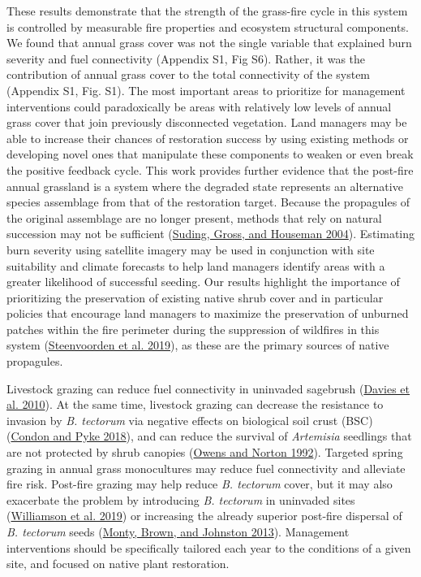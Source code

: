 \documentclass[
  12pt,
]{article}
\begin{document}
These results demonstrate that the strength of the grass-fire cycle in
this system is controlled by measurable fire properties and ecosystem
structural components. We found that annual grass cover was not the
single variable that explained burn severity and fuel connectivity
(Appendix S1, Fig S6). Rather, it was the contribution of annual grass
cover to the total connectivity of the system (Appendix S1, Fig. S1).
The most important areas to prioritize for management interventions
could paradoxically be areas with relatively low levels of annual grass
cover that join previously disconnected vegetation. Land managers may be
able to increase their chances of restoration success by using existing
methods or developing novel ones that manipulate these components to
weaken or even break the positive feedback cycle. This work provides
further evidence that the post-fire annual grassland is a system where
the degraded state represents an alternative species assemblage from
that of the restoration target. Because the propagules of the original
assemblage are no longer present, methods that rely on natural
succession may not be sufficient
(\protect\hyperlink{ref-Suding2004}{Suding, Gross, and Houseman 2004}).
Estimating burn severity using satellite imagery may be used in
conjunction with site suitability and climate forecasts to help land
managers identify areas with a greater likelihood of successful seeding.
Our results highlight the importance of prioritizing the preservation of
existing native shrub cover and in particular policies that encourage
land managers to maximize the preservation of unburned patches within
the fire perimeter during the suppression of wildfires in this system
(\protect\hyperlink{ref-Steenvoorden2019}{Steenvoorden et al. 2019}), as
these are the primary sources of native propagules.

Livestock grazing can reduce fuel connectivity in uninvaded sagebrush
(\protect\hyperlink{ref-Davies2010}{Davies et al. 2010}). At the same
time, livestock grazing can decrease the resistance to invasion by
\emph{B. tectorum} via negative effects on biological soil crust (BSC)
(\protect\hyperlink{ref-Condon2018}{Condon and Pyke 2018}), and can
reduce the survival of \emph{Artemisia} seedlings that are not protected
by shrub canopies (\protect\hyperlink{ref-Owens1992}{Owens and Norton
1992}). Targeted spring grazing in annual grass monocultures may reduce
fuel connectivity and alleviate fire risk. Post-fire grazing may help
reduce \emph{B. tectorum} cover, but it may also exacerbate the problem
by introducing \emph{B. tectorum} in uninvaded sites
(\protect\hyperlink{ref-Williamson2019}{Williamson et al. 2019}) or
increasing the already superior post-fire dispersal of \emph{B.
tectorum} seeds (\protect\hyperlink{ref-Monty2013}{Monty, Brown, and
Johnston 2013}). Management interventions should be specifically
tailored each year to the conditions of a given site, and focused on
native plant restoration.
\end{document}
